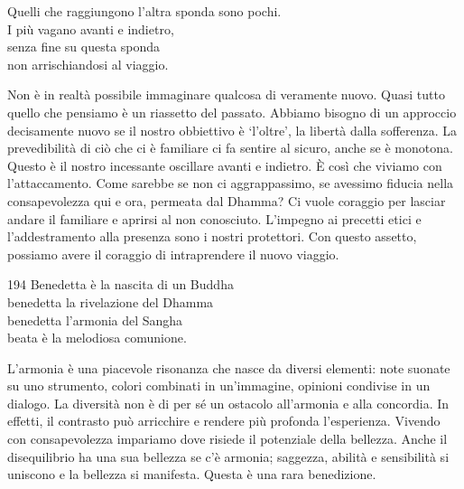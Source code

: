 

\begin{dhpVerse}{85}
\label{dhp-85}
Quelli che raggiungono l'altra sponda sono pochi.\\
I più vagano avanti e indietro,\\
senza fine su questa sponda\\
non arrischiandosi al viaggio.
\end{dhpVerse}

\begin{dhpRefl}
Non \`{e} in realt\`{a} possibile immaginare qualcosa di veramente nuovo. Quasi tutto quello che pensiamo \`{e} un riassetto del passato. Abbiamo bisogno di un approccio decisamente nuovo se il nostro obbiettivo \`{e} `l'oltre', la libert\`{a} dalla sofferenza. La prevedibilit\`{a} di ci\`{o} che ci \`{e} familiare ci fa sentire al sicuro, anche se \`{e} monotona. Questo \`{e} il nostro incessante oscillare avanti e indietro. \`{E} così che viviamo con l'attaccamento. Come sarebbe se non ci aggrappassimo, se avessimo fiducia nella consapevolezza qui e ora, permeata dal Dhamma? Ci vuole coraggio per lasciar andare il familiare e aprirsi al non conosciuto. L'impegno ai precetti etici e l'addestramento alla presenza sono i nostri protettori. Con questo assetto, possiamo avere il coraggio di intraprendere il nuovo viaggio.
\end{dhpRefl}


\begin{dhpVerse}{194}
\label{dhp-194}
Benedetta \`{e} la nascita di un Buddha\\
benedetta la rivelazione del Dhamma\\
benedetta l'armonia del Sangha\\
beata \`{e} la melodiosa comunione.
\end{dhpVerse}

\begin{dhpRefl}
L'armonia \`{e} una piacevole risonanza che nasce da diversi elementi: note suonate su uno strumento, colori combinati in un'immagine, opinioni condivise in un dialogo. La diversit\`{a} non \`{e} di per s\'{e} un ostacolo all'armonia e alla concordia. In effetti, il contrasto pu\`{o} arricchire e rendere più profonda l'esperienza. Vivendo con consapevolezza impariamo dove risiede il potenziale della bellezza. Anche il disequilibrio ha una sua bellezza se c'\`{e} armonia; saggezza, abilit\`{a} e sensibilit\`{a} si uniscono e la bellezza si manifesta. Questa \`{e} una rara benedizione.
\end{dhpRefl}

